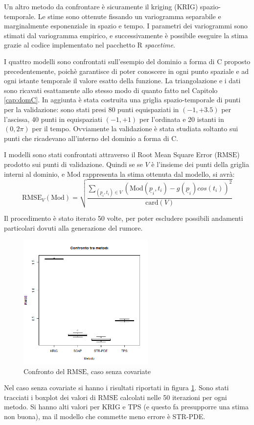 \documentclass[a4paper,11pt,twoside,openright]{book}							%
\begin{document}
Un altro metodo da confrontare è sicuramente il kriging (KRIG) spazio-temporale. Le stime sono ottenute fissando un variogramma separabile e marginalmente esponenziale in spazio e tempo. I parametri dei variogrammi sono stimati dal variogramma empirico, e successivamente è possibile eseguire la stima grazie al codice implementato nel pacchetto R \textit{spacetime}.

I quattro modelli sono confrontati sull'esempio del dominio a forma di C proposto precedentemente, poichè garantisce di poter conoscere in ogni punto spaziale e ad ogni istante temporale il valore esatto della funzione. La triangolazione e i dati sono ricavati esattamente allo stesso modo di quanto fatto nel Capitolo \ref{cap:domC}. In aggiunta è stata costruita una griglia spazio-temporale di punti per la validazione: sono stati presi 80 punti equispaziati in $(-1,+3.5)$ per l'ascissa, 40 punti in equispaziati $(-1,+1)$ per l'ordinata e 20 istanti in $(0,2\pi)$ per il tempo. Ovviamente la validazione è stata studiata soltanto sui punti che ricadevano all'interno del dominio a forma di C.

I modelli sono stati confrontati attraverso il Root Mean Square Error ($\mathrm{RMSE}$) prodotto sui punti di validazione. Quindi se se $V$ è l'insieme dei punti della griglia interni al dominio, e $\mathrm{Mod}$ rappresenta la stima ottenuta dal modello, si avrà:
$$
\mathrm{RMSE}_V(\mathrm{Mod})=\sqrt{\frac{\sum_{(\underline p_i,t_i)\in V} (\mathrm{Mod}(\underline p_i,t_i)-g(\underline p_i)cos(t_i))^2}{\mathrm{card}(V)}}
$$ 

Il procedimento è stato iterato 50 volte, per poter escludere possibili andamenti particolari dovuti alla generazione del rumore.
 
\begin{figure}[t]
	\centering
	\includegraphics[width=0.60\textwidth]{Immagini/Confronto_metodi.png}   
	\caption{Confronto del $\mathrm{RMSE}$, caso senza covariate}
	\label{fig:cfr}
\end{figure}
Nel caso senza covariate si hanno i risultati riportati in figura \ref{fig:cfr}. Sono stati tracciati i boxplot dei valori di $\mathrm{RMSE}$ calcolati nelle 50 iterazioni per ogni metodo. Si hanno alti valori per KRIG e TPS (e questo fa presupporre una stima non buona), ma il modello che commette meno errore è STR-PDE.
\end{document}
